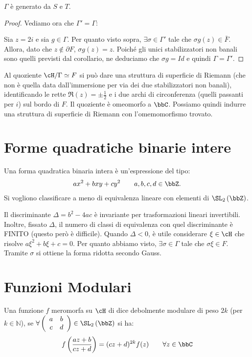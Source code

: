 \begin{teorema}
$\Gamma$ è generato da $S$ e $T$.
\end{teorema}


\begin{proof}
Vediamo ora che $\Gamma'=\Gamma$:

Sia $z=2i$ e sia $g \in \Gamma$. Per quanto visto sopra, $\exists \sigma \in \Gamma'$
tale che $\sigma g(z) \in \bar{F}$. Allora, dato che $z \notin \partial F$,
$\sigma g(z) = z$.
Poiché gli unici stabilizzatori non banali sono quelli
previsti dal corollario, ne deduciamo che $\sigma g = Id$ e quindi $\Gamma = \Gamma'$.
\end{proof}

\begin{osservazione}
  Al quoziente $\cH/\Gamma \simeq F$ si può dare una struttura di superficie di Riemann
  (che non è quella data dall'immersione per via dei due stabilizzatori non banali),
  identificando le rette $\Re(z)=\pm \frac{1}{2}$ e i due archi di circonferenza
  (quelli passanti per $i$) sul bordo di $F$. Il quoziente è omeomorfo a $\bbC$.
  Possiamo quindi indurre una struttura di superficie di Riemann con l'omemomorfismo trovato.
\end{osservazione}

\section{Forme quadratiche binarie intere}
Una forma quadratica binaria intera è un'espressione del tipo:
\[
	ax^2+bxy+cy^2 \qquad a,b,c,d \in \bbZ.
\]
Si vogliono classificare a meno di equivalenza lineare con elementi di
$\SL_2 \left( \bbZ \right)$.

\begin{osservazione}
Il discriminante $\Delta = b^2 - 4 a c$ è invariante per trasformazioni lineari
invertibili. Inoltre, fissato $\Delta$, il numero di classi di equivalenza con
quel discriminante è FINITO (questo però è difficile).
Quando $\Delta < 0$, è utile considerare $\xi \in \cH$ che risolve
$a \xi^2 + b \xi + c =0$. Per quanto abbiamo visto, $\exists \sigma \in \Gamma$
tale che $\sigma \xi \in F$. Tramite $\sigma$ si ottiene la forma ridotta secondo
Gauss.
\end{osservazione}

\section{Funzioni Modulari}
\begin{definizione}
Una funzione $f$ meromorfa su $\cH$ di dice debolmente modulare di peso $2k$ (per $k \in \mathbb{N}$), se $\forall
\left( \begin{array}{cc} a & b \\ c & d \end{array} \right) \in
\SL_2 \left( \bbZ \right)$ si ha:
	\[
		f\left( \frac{az+b}{cz+d} \right) = (cz+d)^{2k} f(z)
		\qquad \forall z \in \bbC
	\]
\end{definizione}

